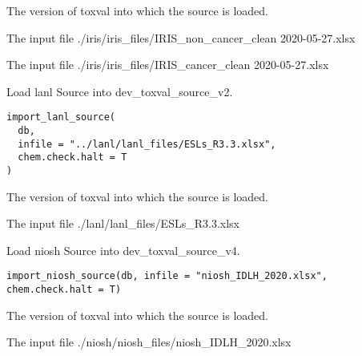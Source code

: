\documentclass[letterpaper]{book}
\begin{document}
%
\begin{Arguments}
\begin{ldescription}
\item[\code{db}] The version of toxval into which the source is loaded.

\item[\code{infile1}] The input file ./iris/iris\_files/IRIS\_non\_cancer\_clean 2020-05-27.xlsx

\item[\code{infile2}] The input file ./iris/iris\_files/IRIS\_cancer\_clean 2020-05-27.xlsx
\end{ldescription}
\end{Arguments}
%
\begin{Description}\relax
Load lanl Source into dev\_toxval\_source\_v2.
\end{Description}
%
\begin{Usage}
\begin{verbatim}
import_lanl_source(
  db,
  infile = "../lanl/lanl_files/ESLs_R3.3.xlsx",
  chem.check.halt = T
)
\end{verbatim}
\end{Usage}
%
\begin{Arguments}
\begin{ldescription}
\item[\code{db}] The version of toxval into which the source is loaded.

\item[\code{infile}] The input file ./lanl/lanl\_files/ESLs\_R3.3.xlsx
\end{ldescription}
\end{Arguments}
%
\begin{Description}\relax
Load niosh Source into dev\_toxval\_source\_v4.
\end{Description}
%
\begin{Usage}
\begin{verbatim}
import_niosh_source(db, infile = "niosh_IDLH_2020.xlsx", chem.check.halt = T)
\end{verbatim}
\end{Usage}
%
\begin{Arguments}
\begin{ldescription}
\item[\code{db}] The version of toxval into which the source is loaded.

\item[\code{infile}] The input file ./niosh/niosh\_files/niosh\_IDLH\_2020.xlsx
\end{ldescription}
\end{Arguments}
\end{document}
